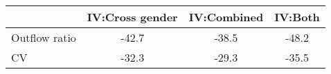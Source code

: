 \begin{tabular}{l*{3}{c}}
\toprule
            &IV:Cross gender& IV:Combined&     IV:Both\\
\midrule
Outflow ratio&       -42.7&       -38.5&       -48.2\\
CV          &       -32.3&       -29.3&       -35.5\\
\bottomrule
\end{tabular}
